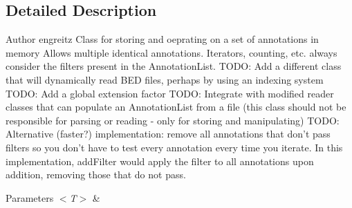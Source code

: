 \subsection{Detailed Description}
\begin{DoxyAuthor}{Author}
engreitz Class for storing and oeprating on a set of annotations in memory Allows multiple identical annotations. Iterators, counting, etc. always consider the filters present in the Annotation\+List. T\+O\+D\+O\+: Add a different class that will dynamically read B\+E\+D files, perhaps by using an indexing system T\+O\+D\+O\+: Add a global extension factor T\+O\+D\+O\+: Integrate with modified reader classes that can populate an Annotation\+List from a file (this class should not be responsible for parsing or reading -\/ only for storing and manipulating) T\+O\+D\+O\+: Alternative (faster?) implementation\+: remove all annotations that don't pass filters so you don't have to test every annotation every time you iterate. In this implementation, add\+Filter would apply the filter to all annotations upon addition, removing those that do not pass. 
\end{DoxyAuthor}

\begin{DoxyParams}{Parameters}
{\em $<$\+T$>$} & \\
\hline
\end{DoxyParams}


